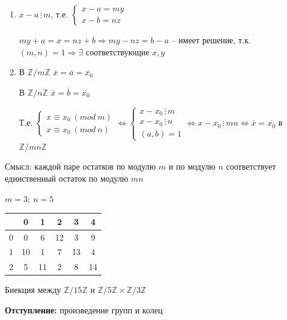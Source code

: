 \documentclass[14pt, letter paper]{article}
\begin{document}
\begin{enumerate}
    \item $x-a \, \vdots \, m$, т.е. $\begin{cases}
        x-a = my \\
        x-b = nz
    \end{cases}$

    $my + a = x = nz + b \Rightarrow my - nz = b - a$ -- имеет решение, т.к. $(m,n) = 1 \Rightarrow \exists$ соответствующие $x, y$

    \item В $\mathbb{Z}/m\mathbb{Z}$ $\overline{x} = \overline{a} = \overline{x_0}$

    В $\mathbb{Z}/n\mathbb{Z}$ $\overline{x} = \overline{b} = \overline{x_0}$

    Т.е. $\begin{cases}
        x \equiv x_0\ (mod\ m) \\
        x \equiv x_0\ (mod\ n)
    \end{cases} \Leftrightarrow \begin{cases}
        x - x_0 \, \vdots \, m \\
        x - x_0 \, \vdots \, n \\
        (a,b) = 1
    \end{cases} \Leftrightarrow x - x_0 \, \vdots \, mn \Leftrightarrow \overline{x} = \overline{x_0}$ в $\mathbb{Z}/mn\mathbb{Z}$
\end{enumerate}

Смысл: каждой паре остатков по модулю $m$ и по модулю $n$ соответствует единственный остаток по модулю $mn$

$m = 3;\ n = 5$

\begin{center}
    \begin{tabular}{|c|c|c|c|c|c|}
        \hline
        & 0 & 1 & 2 & 3 & 4 \\
        \hline
        0 & 0 & 6 & 12 & 3 & 9 \\
        \hline
        1 & 10 & 1 & 7 & 13 & 4 \\
        \hline
        2 & 5 & 11 & 2 & 8 & 14 \\
        \hline
    \end{tabular}
\end{center}

Биекция между $\mathbb{Z}/15\mathbb{Z}$ и $\mathbb{Z}/5\mathbb{Z} \times \mathbb{Z}/3\mathbb{Z}$

\textbf{Отступление:} произведение групп и колец
\end{document}
